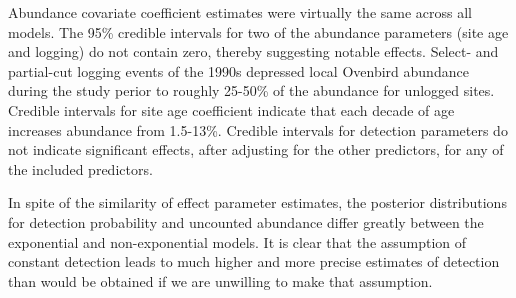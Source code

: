 \documentclass[12pt]{article}
\newif\ifdic   %
\begin{document}
Abundance covariate coefficient estimates were virtually the same across all models.  
The 95\% credible intervals for two of the abundance parameters (site age and logging) do not contain zero, thereby suggesting notable effects.  
Select- and partial-cut logging events of the 1990s depressed local Ovenbird abundance during the study perior to roughly 25-50\% of the abundance for unlogged sites.  
Credible intervals for site age coefficient indicate that each decade of age increases abundance from 1.5-13\%.
Credible intervals for detection parameters do not indicate significant effects, after adjusting for the other predictors, for any of the included predictors.

\ifdic
DIC calculations preferred the exponential mixture TTDD to the lognormal, Weibull, and gamma mixtures (differences of 6.95, 10.7, and 11.5, respectively).  
These differences closely mirror those from the exponential mixture dataset in Sim3, but they also mirror those from the nonpeaked lognormal mixture dataset, where the exponential mixture 95\% credible interval for abundance did not contain the true value, and its posterior median was negatively biased by 18\% of the actual abundance.
\fi

In spite of the similarity of effect parameter estimates, the posterior distributions for detection probability and uncounted abundance differ greatly between the exponential and non-exponential models.  
It is clear that the assumption of constant detection leads to much higher and more precise estimates of detection than would be obtained if we are unwilling to make that assumption.
\end{document}
